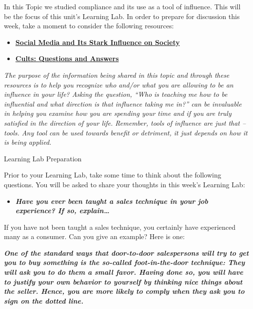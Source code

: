 \documentclass[
]{book}
\providecommand{\tightlist}{%
  \setlength{\itemsep}{0pt}\setlength{\parskip}{0pt}}
\begin{document}
\begin{reflect}
In this Topic we studied compliance and its use as a tool of influence. This will be the focus of this unit's Learning Lab. In order to prepare for discussion this week, take a moment to consider the following resources:

\begin{itemize}
\tightlist
\item
  \href{https://scholarworks.bgsu.edu/cgi/viewcontent.cgi?article=1004\&context=writ}{\textbf{Social Media and Its Stark Influence on Society }}\\
\item
  \href{http://www.csj.org/studyindex/studycult/cultqa3.htm}{\textbf{Cults: Questions and Answers}}
\end{itemize}

\emph{The purpose of the information being shared in this topic and through these resources is to help you recognize who and/or what you are allowing to be an influence in your life? Asking the question, ``Who is teaching me how to be influential and what direction is that influence taking me in?'' can be invaluable in helping you examine how you are spending your time and if you are truly satisfied in the direction of your life. Remember, tools of influence are just that -- tools. Any tool can be used towards benefit or detriment, it just depends on how it is being applied.}

{Learning Lab Preparation}

Prior to your Learning Lab, take some time to think about the following questions. You will be asked to share your thoughts in this week's Learning Lab:

\begin{itemize}
\tightlist
\item
  \textbf{\emph{Have you ever been taught a sales technique in your job experience? If so, explain\ldots{}}}
\end{itemize}

If you have not been taught a sales technique, you certainly have experienced many as a consumer. Can you give an example? Here is one:

\textbf{\emph{One of the standard ways that door-to-door salespersons will try to get you to buy something is the so-called foot-in-the-door technique: They will ask you to do them a small favor. Having done so, you will have to justify your own behavior to yourself by think­ing nice things about the seller. Hence, you are more likely to comply when they ask you to sign on the dotted line.}}
\end{reflect}
\end{document}
